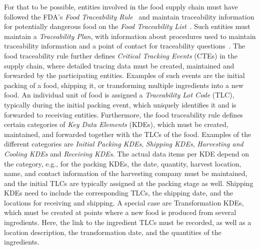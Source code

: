 For that to be possible, entities involved in the food supply chain must have followed the FDA's \textit{Food Traceability Rule}~\cite{fdafaq} and maintain traceability information for potentially dangerous food on the \textit{Food Traceability List}~\cite{fdaftl}. Such entities must maintain a \textit{Traceability Plan}, with information about procedures used to maintain traceability information and a point of contact for traceability questions~\cite{fdatp}. The food traceability rule further defines \textit{Critical Tracking Events} (CTEs) in the supply chain, where detailed tracing data must be created, maintained and forwarded by the participating entities. Examples of such events are the initial packing of a food, shipping it, or transforming multiple ingredients into a new food. An individual unit of food is assigned a \textit{Traceability Lot Code} (TLC),  typically during the initial packing event, which uniquely identifies it and is forwarded to receiving entities. Furthermore, the food traceability rule defines certain categories of \textit{Key Data Elements} (KDEs), which must be created, maintained, and forwarded together with the TLCs of the food. Examples of the different categories are \textit{Initial Packing KDEs}, \textit{Shipping KDEs}, \textit{Harvesting and Cooling KDEs} and \textit{Receiving KDEs}. The actual data items per KDE depend on the category, e.g., for the packing KDEs, the date, quantity, harvest location, name, and contact information of the harvesting company must be maintained, and the initial TLCs are typically assigned at the packing stage as well. Shipping KDEs need to include the corresponding TLCs, the shipping date, and the locations for receiving and shipping. A special case are Transformation KDEs, which must be created at points where a new food is produced from several ingredients. Here, the link to the ingredient TLCs must be recorded, as well as a location description, the transformation date, and the quantities of the ingredients.
